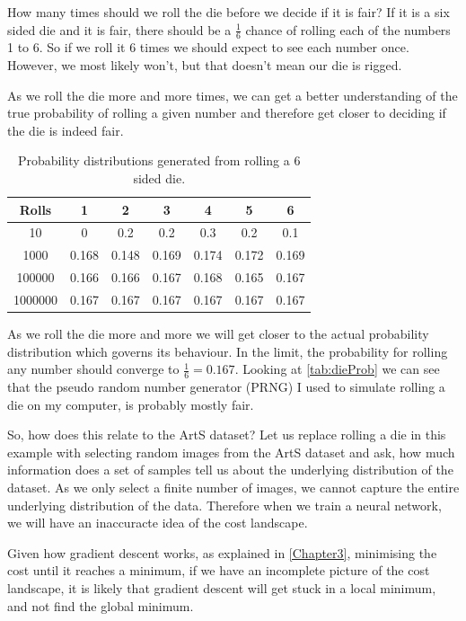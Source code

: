 How many times should we roll the die before we decide if it is fair? If it is a six sided die and it is fair, there should be a $\frac{1}{6}$ chance of rolling each of the numbers 1 to 6. So if we roll it 6 times we should expect to see each number once. However, we most likely won't, but that doesn't mean our die is rigged.

As we roll the die more and more times, we can get a better understanding of the true probability of rolling a given number and therefore get closer to deciding if the die is indeed fair.

\begin{table}[h]
\centering
	\begin{tabular}{|c|c|c|c|c|c|c|}
	\hline
	\textbf{Rolls} & \textbf{1} & \textbf{2} & \textbf{3} & \textbf{4} & \textbf{5} & \textbf{6} \\ \hline
	10 & 0 & 0.2 & 0.2 & 0.3 & 0.2 & 0.1 \\ \hline
	1000 & 0.168 & 0.148 & 0.169 & 0.174 & 0.172 & 0.169  \\ \hline
	100000 & 0.166 & 0.166 & 0.167 & 0.168 & 0.165 & 0.167  \\ \hline
	1000000 & 0.167 & 0.167 & 0.167 & 0.167 & 0.167 & 0.167  \\ \hline
	\end{tabular}
	\caption{Probability distributions generated from rolling a 6 sided die.}
	\label{tab:dieProb}
\end{table}

As we roll the die more and more we will get closer to the actual probability distribution which governs its behaviour. In the limit, the probability for rolling any number should converge to $\frac{1}{6} = 0.167$. Looking at \autoref{tab:dieProb} we can see that the pseudo random number generator (PRNG) I used to simulate rolling a die on my computer, is probably mostly fair. 

So, how does this relate to the ArtS dataset? Let us replace rolling a die in this example with selecting random images from the ArtS dataset and ask, how much information does a set of samples tell us about the underlying distribution of the dataset. As we only select a finite number of images, we cannot capture the entire underlying distribution of the data. Therefore when we train a neural network, we will have an inaccuracte idea of the cost landscape.

Given how gradient descent works, as explained in \autoref{Chapter3},  minimising the cost until it reaches a minimum, if we have an incomplete picture of the cost landscape, it is likely that gradient descent will get stuck in a local minimum, and not find the global minimum.


